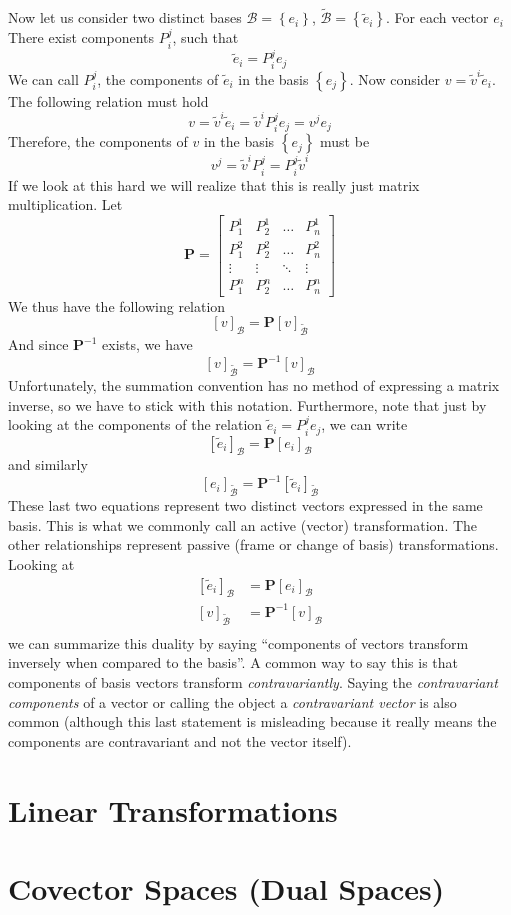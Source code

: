 \documentclass[a4paper]{article}
\begin{document}
Now let us consider two distinct bases $\mathcal{B} = \left\{ e_i \right\}$, $\widetilde{\mathcal{B}} = \left\{ \tilde{e}_i \right\}$. For each vector $e_i$ There exist components $P_i^j$, such that
\[
  \tilde{e}_i = P_i^j e_j
\]
We can call $P_i^j$, the components of $\tilde{e}_i$ in the basis $\left\{e_j\right\}$. Now consider $v = \tilde{v}^i \tilde{e}_i$. The following relation must hold
\[
  v = \tilde{v}^i \tilde{e}_i = \tilde{v}^i P_i^j e_j = v^j e_j
\]
Therefore, the components of $v$ in the basis $ \left\{ e_j \right\}$ must be
\[
  v^j = \tilde{v}^i P_i^j = P_i^j \tilde{v}^i
\]
If we look at this hard we will realize that this is really just matrix multiplication. Let
\[
  \bm{P} = 
  \begin{bmatrix}
    P_1^1 & P_2^1 & \dots & P_n^1 \\
    P_1^2 & P_2^2 & \dots & P_n^2 \\
    \vdots & \vdots & \ddots & \vdots \\
    P_1^n & P_2^n & \dots & P_n^n
  \end{bmatrix}
\]
We thus have the following relation
\[
  \left[ v \right]_{\mathcal{B}} = \bm{P} \left[ v \right]_{\widetilde{\mathcal{B}}}
\]
And since $\bm{P}^{-1}$ exists, we have
\[
  \left[ v \right]_{\widetilde{\mathcal{B}}} = \bm{P}^{-1} \left[ v \right]_{\mathcal{B}}
\]
Unfortunately, the summation convention has no method of expressing a matrix inverse, so we have to stick with this notation. Furthermore, note that just by looking at the components of the relation $\tilde{e}_i = P_i^j e_j$, we can write
\[
  \left[ \tilde{e}_i \right]_{\mathcal{B}} = \bm{P} \left[ e_i \right]_{\mathcal{B}}
\]
and similarly
\[
  \left[ e_i \right]_{\widetilde{\mathcal{B}}} = \bm{P}^{-1} \left[ \tilde{e}_i \right]_{\widetilde{\mathcal{B}}} 
\]
These last two equations represent two distinct vectors expressed in the same basis. This is what we commonly call an active (vector) transformation. The other relationships represent passive (frame or change of basis) transformations. Looking at 
\[
\begin{aligned}
  \left[ \tilde{e}_i \right]_{\mathcal{B}} &= \bm{P} \left[ e_i \right]_{\mathcal{B}} \\
  \left[ v \right]_{\widetilde{\mathcal{B}}} &= \bm{P}^{-1} \left[ v \right]_{\mathcal{B}} \\
\end{aligned}
\]
we can summarize this duality by saying ``components of vectors transform inversely when compared to the basis''. A common way to say this is that components of basis vectors transform \textit{contravariantly}. Saying the \textit{contravariant components} of a vector or calling the object a \textit{contravariant vector} is also common (although this last statement is misleading because it really means the components are contravariant and not the vector itself).

\section*{Linear Transformations}%

\section*{Covector Spaces (Dual Spaces)}%
\end{document}
